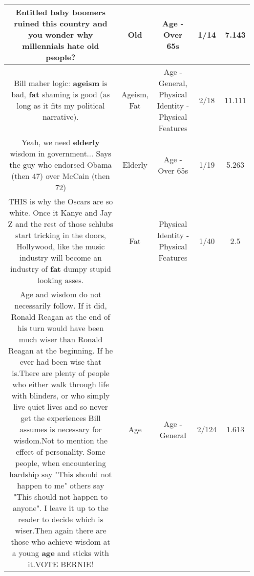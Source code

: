 \documentclass[11pt]{article}
\newlength\mylength
\begin{document}
\begin{center}
\begin{longtable}{|C{.65\mylength}|C{.30\mylength}|C{.12\mylength}|C{.12\mylength}|C{.12\mylength}|}
  \small Entitled baby boomers ruined this country and you wonder why millennials hate \textbf{old} people?\normalsize   & Old & Age - Over 65s & 1/14 & 7.143 \\  \hline
  \small Bill maher logic: \textbf{ageism} is bad, \textbf{fat} shaming is good (as long as it fits my political narrative).\normalsize   & Ageism, Fat & Age - General, Physical Identity - Physical Features & 2/18 & 11.111 \\  \hline
  \small Yeah, we need \textbf{elderly} wisdom in government... Says the guy who endorsed Obama (then 47) over McCain (then 72)\normalsize   & Elderly & Age - Over 65s & 1/19 & 5.263 \\  \hline
  \small THIS is why the Oscars are so white. Once it Kanye and Jay Z and the rest of those schlubs start tricking in the doors, Hollywood, like the music industry will become an industry of \textbf{fat} dumpy stupid looking asses.\normalsize   & Fat & Physical Identity - Physical Features & 1/40 & 2.5 \\  \hline
  \small Age and wisdom do not necessarily follow. If it did, Ronald Reagan at the end of his turn would have been much wiser than Ronald Reagan at the beginning. If he ever had been wise that is.There are plenty of people who either walk through life with blinders, or who simply live quiet lives and so never get the experiences Bill assumes is necessary for wisdom.Not to mention the effect of personality. Some people, when encountering hardship say "This should not happen to me" others say "This should not happen to anyone". I leave it up to the reader to decide which is wiser.Then again there are those who achieve wisdom at a young \textbf{age} and sticks with it.VOTE BERNIE!\normalsize   & Age & Age - General & 2/124 & 1.613 \\  \hline

\end{longtable}
\end{center}
\end{document}
